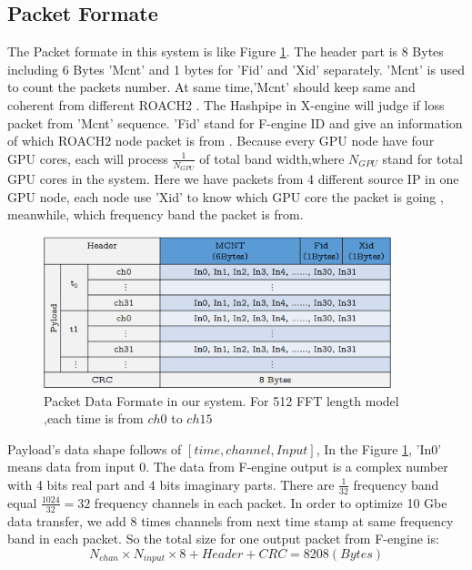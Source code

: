 \documentclass{ws-jai}
\begin{document}
\subsection{Packet Formate \label{sec:Data formate}}
The Packet formate in this system is like Figure \ref{fig:data_formate}. The header part is 8 Bytes including 6 Bytes 'Mcnt' and 1 bytes for 'Fid' and 'Xid' separately. 'Mcnt' is used to count the packets number. At same time,'Mcnt' should keep same and coherent from different ROACH2 . The Hashpipe in X-engine will judge if loss packet from 'Mcnt' sequence. 'Fid' stand for F-engine ID and give an information of which ROACH2 node packet is from . Because every GPU node have four GPU cores, each will process $\frac{1}{N_{GPU}}$ of total band width,where $N_{GPU}$ stand for total GPU cores in the system. Here we have packets from 4 different source IP in one GPU node, each node use 'Xid' to know which GPU core the packet is going , meanwhile, which frequency band the packet is from. 
\begin{figure}[t]
\centering
\includegraphics[width=0.9\textwidth]{./picture/Packet.eps}
\caption{Packet Data Formate in our system. For 512 FFT length model ,each time is from $ch0$ to $ch15$\label{fig:data_formate}}
\end{figure}

	Payload's data shape follows of $[time, channel, Input]$, In the Figure \ref{fig:data_formate}, 'In0' means data from input 0. The data from F-engine output is a complex number with 4 bits real part and 4 bits imaginary parts. There are $\frac{1}{32}$ frequency band equal $\frac{1024}{32}=32$ frequency channels in each packet. In order to optimize 10 Gbe data transfer, we add 8 times channels from next time stamp at same frequency band in each packet.  So the total size for one output packet from F-engine is:
\begin{equation} 
N_{chan}  \times N_{input} \times 8 + Header + CRC = 8208  (Bytes)
\end{equation}
\end{document}
